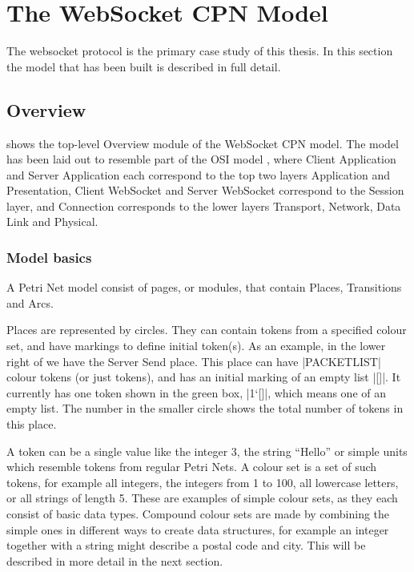 \section{The WebSocket CPN Model}

The websocket protocol is the primary case study of this thesis. 
In this section the model that has been built is described in full detail.

\subsection{Overview}

	
	 shows the top-level Overview module of the WebSocket
	CPN model. 
	The model has been laid out to resemble part of the OSI model \cite{osi7},
	where Client Application and Server Application each correspond to the top two
	layers Application and Presentation, Client WebSocket and Server WebSocket 
	correspond to the Session layer, and Connection corresponds to the lower layers
	Transport, Network, Data Link and Physical. 
	
	\subsubsection{Model basics}
	A Petri Net model consist of pages, or modules, that contain Places,
	Transitions and Arcs.
	
	Places are represented by circles. They can contain tokens from a specified
	colour set, and have markings to define initial token(s).  As an example, in
	the lower right of  we have the Server Send place. This place
	can have |PACKETLIST| colour tokens (or just tokens), and has an initial
	marking of an empty list |[]|. It currently has one token shown in the green box,
	|1`[]|, which means one of an empty list. The number in the smaller circle
	shows the total number of tokens in this place.
	
	A token can be a single value like the integer 3, the string ``Hello''
	or simple units which resemble tokens from regular Petri Nets. A colour set is
	a set of such tokens, for example all integers, the integers from 1 to
	100, all lowercase letters, or all strings of length 5. These are examples of simple
	colour sets, as they each consist of basic data types. Compound colour sets are
	made by combining the simple ones in different ways to create data structures, for
	example an integer together with a string might describe a postal code and
	city. This will be described in more detail in the next section.
	
